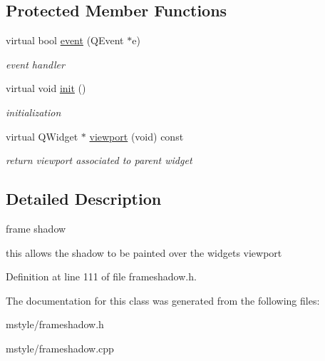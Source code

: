 \subsection*{Protected Member Functions}
\begin{DoxyCompactItemize}
\item 
\mbox{\label{class_frame_shadow_base_a3e611982f6aaea277cfbb55ad5fe2f4f}} 
virtual bool \hyperlink{class_frame_shadow_base_a3e611982f6aaea277cfbb55ad5fe2f4f}{event} (Q\+Event $\ast$e)
\begin{DoxyCompactList}\small\item\em event handler \end{DoxyCompactList}\item 
\mbox{\label{class_frame_shadow_base_aa55d66523d7355fca7843cc39075a7cd}} 
virtual void \hyperlink{class_frame_shadow_base_aa55d66523d7355fca7843cc39075a7cd}{init} ()
\begin{DoxyCompactList}\small\item\em initialization \end{DoxyCompactList}\item 
\mbox{\label{class_frame_shadow_base_ab5c6efb460f754567974eeaa42fac6a7}} 
virtual Q\+Widget $\ast$ \hyperlink{class_frame_shadow_base_ab5c6efb460f754567974eeaa42fac6a7}{viewport} (void) const
\begin{DoxyCompactList}\small\item\em return viewport associated to parent widget \end{DoxyCompactList}\end{DoxyCompactItemize}


\subsection{Detailed Description}
frame shadow 

this allows the shadow to be painted over the widgets viewport 

Definition at line 111 of file frameshadow.\+h.



The documentation for this class was generated from the following files\+:\begin{DoxyCompactItemize}
\item 
mstyle/frameshadow.\+h\item 
mstyle/frameshadow.\+cpp\end{DoxyCompactItemize}
